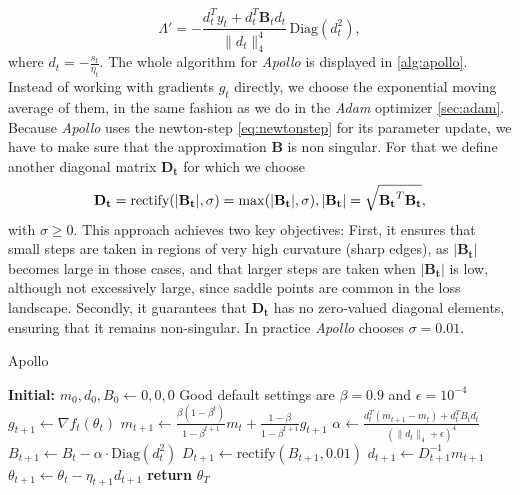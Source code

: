 \begin{equation}
    \Lambda' = - \frac{d_t^T y_t + d_t^T \mathbf{B}_t d_t}{\|d_t\|_4^4} \, \text{Diag}(d_t^2),
\end{equation}
where \( d_t = - \frac{s_t}{\eta_t} \). The whole algorithm for \emph{Apollo} is displayed in \ref{alg:apollo}.
Instead of working with gradients \( g_t \) directly, we choose the exponential moving average of them, in the
same fashion as we do in the \emph{Adam} optimizer \ref{sec:adam}. Because \emph{Apollo} uses the newton-step \ref{eq:newtonstep}
for its parameter update, we have to make sure that the approximation $ \mathbf{B}$ is non singular.
For that we define another diagonal matrix $ \mathbf{D_t}$ for which we choose
\begin{equation}
    \mathbf{D_t} =  \text{rectify}(|\mathbf{B_t}|,\sigma) = \max(|\mathbf{B_t}|,\sigma), \\ |\mathbf{B_t}| = \sqrt{\mathbf{B_t}^T\mathbf{B_t}},
\end{equation}
with $\sigma \geq 0$.
This approach achieves two key objectives: First, it ensures that small steps are taken in regions of very high curvature (sharp edges),
as \( |\mathbf{B_t}| \) becomes large in those cases, and that larger steps are taken when \( |\mathbf{B_t}| \) is low, although not excessively large, since saddle points are common in the loss landscape.
Secondly, it guarantees that \( \mathbf{D_t} \) has no zero-valued diagonal elements, ensuring that it remains non-singular.
In practice \emph{Apollo} chooses $\sigma=0.01$.\cite{apollo}

\label{alg:apollo}
\begin{algorithm}
    \caption{Apollo}
    \begin{algorithmic}[1]
    \State \textbf{Initial:} $m_0, d_0, B_0 \leftarrow 0, 0, 0$ 
    \State Good default settings are $\beta = 0.9$ and $\epsilon = 10^{-4}$
            \State $g_{t+1} \leftarrow \nabla f_t(\theta_t)$ 
            \State $m_{t+1} \leftarrow \frac{\beta(1-\beta^t)}{1-\beta^{t+1}}m_t + \frac{1-\beta}{1-\beta^{t+1}}g_{t+1}$ 
            \State $\alpha \leftarrow \frac{d_t^T(m_{t+1}-m_t)+d_t^TB_td_t}{(\|d_t\|_4+\epsilon)^4}$ 
            \State $B_{t+1} \leftarrow B_t - \alpha \cdot \text{Diag}(d_t^2)$ 
            \State $D_{t+1} \leftarrow \text{rectify}(B_{t+1}, 0.01)$ 
            \State $d_{t+1} \leftarrow D_{t+1}^{-1}m_{t+1}$ 
            \State $\theta_{t+1} \leftarrow \theta_t - \eta_{t+1}d_{t+1}$ 
        \EndFor
    \EndWhile
    \State \textbf{return} $\theta_T$
    \end{algorithmic}
    \end{algorithm}

